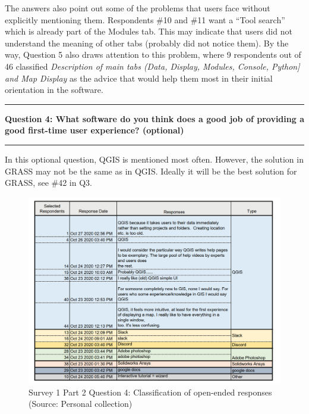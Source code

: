 \documentclass[a4paper,10pt,twoside]{article}
\begin{document}
The answers also point out some of the problems that users face without explicitly mentioning them. Respondents \#10 and \#11 want a ``Tool search'' which is already part of the Modules tab. This may indicate that users did not understand the meaning of other tabs (probably did not notice them). By the way, Question 5 also draws attention to this problem, where 9 respondents out of 46 classified \textit{Description of main tabs (Data, Display, Modules, Console, Python] and Map Display} as the advice that would help them most in their initial orientation in the software.

\par\noindent\rule{\textwidth}{0.4pt}
\noindent \textbf{Question 4: What software do you think does a good job of providing a good first-time user experience? (optional)}
\par\noindent\rule{\textwidth}{0.4pt}
\noindent In this optional question, QGIS is mentioned most often. However, the solution in GRASS may not be the same as in QGIS. Ideally it will be the best solution for GRASS, see \#42 in Q3.

\vspace{0.3cm}
\begin{figure}[hbt!] 
\begin{center}
\includegraphics[width=17cm]{../surveys/analyzed_data/survey1_part2_question4_open_ended_1.png} 
\caption[Survey 1 Part 2 Question 4: Classification of open-ended responses]{Survey 1 Part 2 Question 4: Classification of open-ended responses (Source: Personal collection)}
\label{fig:survey1_part2_question4_open_ended_1}
\end{center}
\end{figure}
\end{document}
